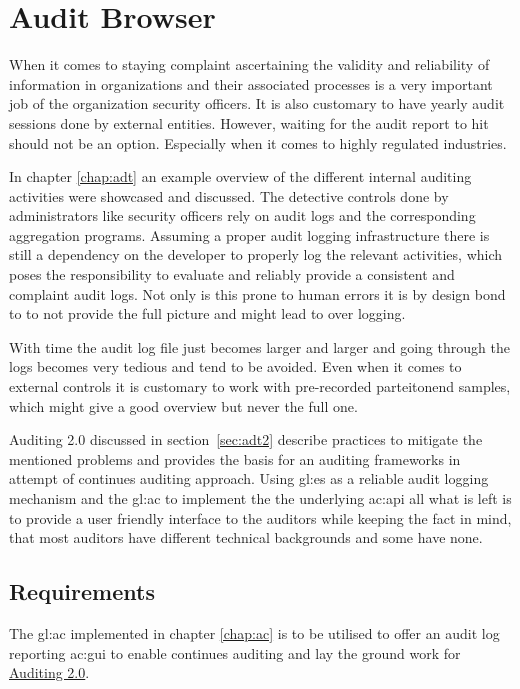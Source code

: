 %
\chapter{Audit Browser}\label{chap:ab}

When it comes to staying complaint ascertaining the validity and reliability of information in organizations and their associated processes is a very important job of the organization security officers. It is also customary to have yearly audit sessions done by external entities. However, waiting for the audit report to hit should not be an option. Especially when it comes to highly regulated industries.

In chapter \ref{chap:adt} an example overview of the different internal auditing activities were showcased and discussed. The detective controls done by administrators like security officers rely on audit logs and the corresponding aggregation programs. Assuming a proper audit logging infrastructure there is still a dependency on the developer to properly log the relevant activities, which poses the responsibility to evaluate and reliably provide a consistent and complaint audit logs. Not only is this prone to human errors it is by design bond to to not provide the full picture and might lead to over logging. 

With time the audit log file just becomes larger and larger and going through the logs becomes very tedious and tend to be avoided. Even when it comes to external controls it is customary to work with pre-recorded parteitonend samples, which might give a good overview but never the full one. 

Auditing 2.0 discussed in section~\ref{sec:adt2} describe practices to mitigate the mentioned problems and provides the basis for an auditing frameworks in attempt of continues auditing approach. Using \gls{gl:es} as a reliable audit logging mechanism and the \gls{gl:ac} to implement the the underlying \gls{ac:api} all what is left is to provide a user friendly interface to the auditors while keeping the fact in mind, that most auditors have different technical backgrounds and some have none.

\section{Requirements}

The \gls{gl:ac} implemented in chapter \ref{chap:ac} is to be utilised to offer an audit log reporting \gls{ac:gui} to enable continues auditing and lay the ground work for \hyperref[sec:adt2]{Auditing 2.0}.

